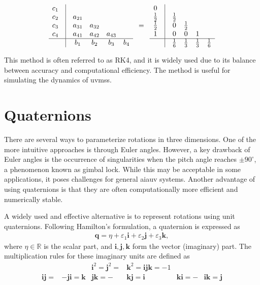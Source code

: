 \begin{align}
    \begin{matrix}
        c_1 & \vline & & & & \\
        c_2 & \vline & a_{21} & & & \\
        c_3 & \vline & a_{31} & a_{32} & & \\
        c_4 & \vline & a_{41} & a_{42} & a_{43} & \\
        \hline
        & \vline & b_1 & b_2 & b_3 & b_4
    \end{matrix}
    \quad=\quad 
    \begin{matrix}
        0 & \vline & & & & \\
        \frac{1}{2} & \vline & \frac{1}{2} & & & \\
        \frac{1}{2} & \vline & 0 & \frac{1}{2} & & \\
        1 & \vline & 0 & 0 & 1 & \\
        \hline
        & \vline & \frac{1}{6} & \frac{1}{3} & \frac{1}{3} & \frac{1}{6}
    \end{matrix}
\end{align}

This method is often referred to as RK4, and it is widely used due to its
balance between accuracy and computational efficiency. The method is
useful for simulating the dynamics of \gls{uvms}s.


\section{Quaternions}
\label{sec:background:quaternions}

There are several ways to parameterize rotations in three dimensions. One of 
the more intuitive approaches is through Euler angles. However, a key drawback 
of Euler angles is the occurrence of singularities when the pitch angle 
reaches $\pm90^\circ$, a phenomenon known as gimbal lock. While this may be 
acceptable in some applications, it poses challenges for general \gls{aiauv} 
systems. Another advantage of using quaternions is that they are often computationally more efficient and numerically stable. 

A widely used and effective alternative is to represent rotations using unit 
quaternions. Following Hamilton’s formulation, a quaternion is expressed as
\begin{align}
    \bm{q} = \eta + \varepsilon_1 \bm{i} + \varepsilon_2 \bm{j} + \varepsilon_3 \bm{k},
\end{align}
where $\eta \in \mathbb{R}$ is the scalar part, and \(\bm{i}, \bm{j}, \bm{k}\) 
form the vector (imaginary) part. The multiplication rules for these imaginary 
units are defined as
\begin{align}
    && \bm{i}^2 = \bm{j}^2 = &\bm{k}^2 = \bm{i}\bm{j}\bm{k} = -1 &&\\
    \bm{i}\bm{j} = &-\bm{j}\bm{i} = \bm{k} & \bm{j}\bm{k} = -&\bm{k}\bm{j} = \bm{i} & \bm{k}\bm{i} = -&\bm{i}\bm{k} = \bm{j}
\end{align}

